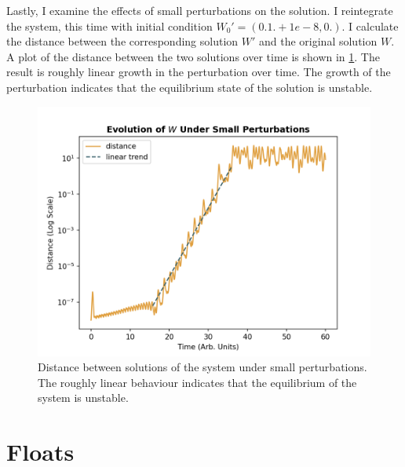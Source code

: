 \documentclass[linenumbers,trackchanges]{aastex7}
\begin{document}
Lastly, I examine the effects of small perturbations on the solution. I reintegrate the system, this time with initial condition $W_0' = (0. 1. + 1e-8, 0.)$. I calculate the distance between the corresponding solution $W'$ and the original solution $W$. A plot of the distance between the two solutions over time is shown in \ref{fig:q5p5}. The result is roughly linear growth in the perturbation over time. The growth of the perturbation indicates that the equilibrium state of the solution is unstable. 

\begin{figure}
     \includegraphics{figures/q3p5.png}
     \caption{Distance between solutions of the system under small perturbations. The roughly linear behaviour indicates that the equilibrium of the system is unstable.}
     \label{fig:q5p5}
\end{figure}
\section{Floats} \label{sec:floats}



{}



\end{document}
